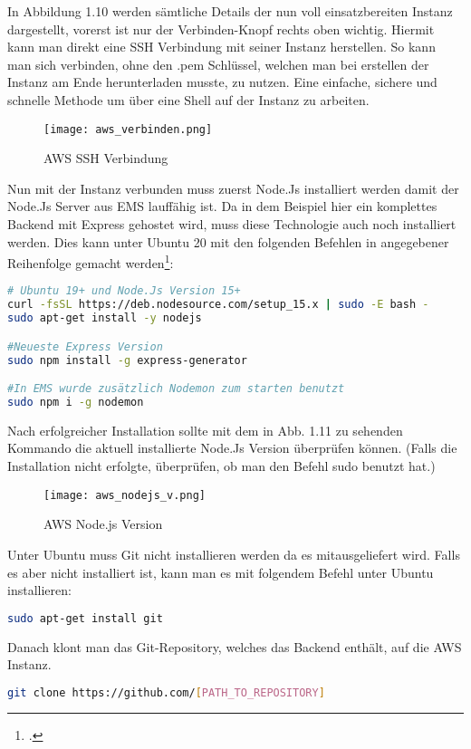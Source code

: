 In Abbildung 1.10 werden sämtliche Details der nun voll einsatzbereiten Instanz dargestellt, vorerst ist nur der Verbinden-Knopf rechts oben wichtig. Hiermit kann man direkt eine SSH Verbindung mit seiner Instanz herstellen.
So kann man sich verbinden, ohne den .pem Schlüssel, welchen man bei erstellen der Instanz am Ende herunterladen musste, zu nutzen. Eine einfache, sichere und schnelle Methode um über eine Shell auf der Instanz zu arbeiten.
\begin{center}
\begin{figure}[H]
    \centering
    \texttt{[image: aws\_verbinden.png]}
    \caption{AWS SSH Verbindung}
\end{figure}
\end{center}
Nun mit der Instanz verbunden muss zuerst Node.Js installiert werden damit der Node.Js Server aus EMS lauffähig ist. Da in dem Beispiel hier ein komplettes Backend mit Express gehostet wird, muss diese Technologie auch noch installiert werden. Dies kann unter Ubuntu 20 mit den folgenden Befehlen in angegebener Reihenfolge gemacht werden\footcite{deploy-nodejs1}:
\begin{lstlisting}[language=bash]
# Ubuntu 19+ und Node.Js Version 15+
curl -fsSL https://deb.nodesource.com/setup_15.x | sudo -E bash -
sudo apt-get install -y nodejs

#Neueste Express Version
sudo npm install -g express-generator

#In EMS wurde zusätzlich Nodemon zum starten benutzt
sudo npm i -g nodemon
\end{lstlisting}
Nach erfolgreicher Installation sollte mit dem in Abb. 1.11 zu sehenden Kommando die aktuell installierte Node.Js Version überprüfen können.
(Falls die Installation nicht erfolgte, überprüfen, ob man den Befehl sudo benutzt hat.)
\begin{center}
\begin{figure}[H]
    \centering
    \texttt{[image: aws\_nodejs\_v.png]}
    \caption{AWS Node.js Version}
\end{figure}
\end{center}
Unter Ubuntu muss Git nicht installieren werden da es mitausgeliefert wird. Falls es aber nicht installiert ist, kann man es mit folgendem Befehl unter Ubuntu installieren:
\begin{lstlisting}[language=bash]
sudo apt-get install git
\end{lstlisting}
Danach klont man das Git-Repository, welches das Backend enthält, auf die AWS Instanz.
\begin{lstlisting}[language=bash]
git clone https://github.com/[PATH_TO_REPOSITORY]
\end{lstlisting}
